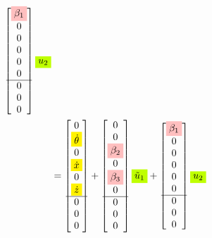 \documentclass[12pt]{article}
\begin{document}
\begin{align*}
\begin{bmatrix}
            \colorbox{pink}{$\beta_1$} \\
            0 \\
            0 \\
            0 \\
            0 \\
            0 \\    
            \hline        
            0 \\
            0 \\
            0 \\
        \end{bmatrix} \colorbox{lime}{$u_2$} \\
    &= \begin{bmatrix}
        0 \\
        \colorbox{yellow}{$\dot{\theta}$} \\
        0 \\
        \colorbox{yellow}{$\dot{x}$} \\
        0 \\
        \colorbox{yellow}{$\dot{z}$} \\
        \hline
        0 \\
        0 \\
        0 \\
    \end{bmatrix} +  \begin{bmatrix}
        0 \\
        0 \\
        \colorbox{pink}{$\beta_2$} \\
        0 \\
        \colorbox{pink}{$\beta_3$} \\
        0 \\
        \hline
        0 \\
        0 \\
        0 \\
    \end{bmatrix} \colorbox{lime}{$\tilde{u}_1$} + \begin{bmatrix}
        \colorbox{pink}{$\beta_1$} \\
        0 \\
        0 \\
        0 \\
        0 \\
        0 \\ 
        \hline
        0 \\
        0 \\
        0 \\
    \end{bmatrix} \colorbox{lime}{$u_2$} 
\end{align*}
\end{document}

